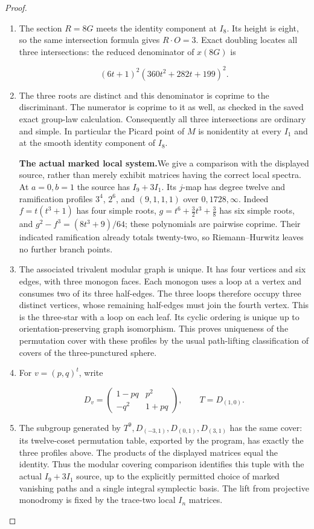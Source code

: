 \begin{proof}
\begin{enumerate}[label=\arabic*.]
\item The section \(R=8G\) meets the identity component at \(I_8\).
Its height is eight, so the same intersection formula gives
\(R\cdot O=3\).  Exact doubling locates all three intersections:
the reduced denominator of \(x(8G)\) is

\[
 (6t+1)^2(360t^2+282t+199)^2.
\]

\item The three roots are distinct and this denominator is coprime to
the discriminant.  The numerator is coprime to it as well, as
checked in the saved exact group-law calculation.  Consequently
all three intersections are ordinary and simple.  In particular
the Picard point of \(M\) is nonidentity at every \(I_1\) and
at the smooth identity component of \(I_8\).

\par\medskip\noindent\textbf{The actual marked local system.}\enspace We give a comparison
with the displayed source, rather than merely exhibit matrices
having the correct local spectra.  At \(a=0,b=1\) the source has
\(I_9+3I_1\).  Its \(j\)-map has degree twelve and ramification
profiles \(3^4\), \(2^6\), and \((9,1,1,1)\) over
\(0,1728,\infty\).  Indeed \(f=t(t^3+1)\) has four simple
roots, \(g=t^6+\frac32t^3+\frac38\) has six simple roots,
and \(g^2-f^3=(8t^3+9)/64\); these polynomials are pairwise
coprime.  Their indicated ramification already totals twenty-two,
so Riemann--Hurwitz leaves no further branch points.

\item The associated trivalent modular graph is unique.  It has four
vertices and six edges, with three monogon faces.  Each monogon
uses a loop at a vertex and consumes two of its three half-edges.
The three loops therefore occupy three distinct vertices, whose
remaining half-edges must join the fourth vertex.  This is the
three-star with a loop on each leaf.  Its cyclic ordering is unique
up to orientation-preserving graph isomorphism.  This proves
uniqueness of the permutation cover with these profiles by the
usual path-lifting classification of covers of the three-punctured
sphere.

\item For \(v=(p,q)^t\), write

\[
 D_v=\begin{pmatrix}1-pq&p^2\\-q^2&1+pq\end{pmatrix},
 \qquad T=D_{(1,0)}.
\]

\item The subgroup generated by
\(T^9,D_{(-3,1)},D_{(0,1)},D_{(3,1)}\) has the same cover:
its twelve-coset permutation table, exported by the program, has
exactly the three profiles above.  The products of the displayed
matrices equal the identity.  Thus the modular covering comparison
identifies this tuple with the actual \(I_9+3I_1\) source, up to
the explicitly permitted choice of marked vanishing paths and a
single integral symplectic basis.  The lift from projective
monodromy is fixed by the trace-two local \(I_n\) matrices.


\end{enumerate}
\end{proof}

